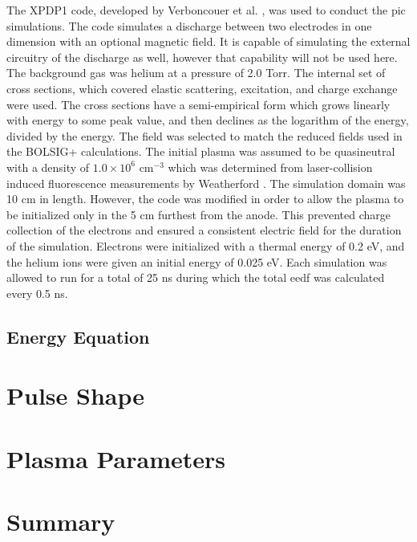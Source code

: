 The XPDP1 code, developed by Verboncouer et al. \cite{Verboncouer1993}, was used
to conduct the \acs{pic} simulations. The code simulates a discharge between two
electrodes in one dimension with an optional magnetic field. It is capable of
simulating the external circuitry of the discharge as well, however that
capability will not be used here. The background gas was helium at a pressure of
2.0 Torr. The internal set of cross sections, which covered elastic scattering,
excitation, and charge exchange were used. The cross sections have a
semi-empirical form which grows linearly with energy to some peak value, and
then declines as the logarithm of the energy, divided by the energy. The field
was selected to match the reduced fields used in the BOLSIG+ calculations. The
initial plasma was assumed to be quasineutral with a density of
$1.0\times10^{6}$ cm$^{-3}$ which was determined from laser-collision induced
fluorescence measurements by Weatherford \cite{Weatherford2012}. The simulation
domain was 10 cm in length. However, the code was modified in order to allow the
plasma to be initialized only in the 5 cm furthest from the anode. This
prevented charge collection of the electrons and ensured a consistent electric
field for the duration of the simulation. Electrons were initialized with a
thermal energy of 0.2 eV, and the helium ions were given an initial energy of
0.025 eV. Each simulation was allowed to run for a total of 25 ns during which
the total \acs{eedf} was calculated every 0.5 ns.



\subsection{Energy Equation}



\section{Pulse Shape}



\section{Plasma Parameters}



\section{Summary}



